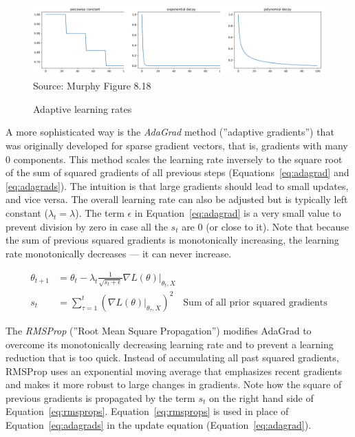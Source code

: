 \begin{figure}
\includegraphics[width=\textwidth]{screen5.png} \\

\scriptsize Source: Murphy Figure 8.18
\caption{Adaptive learning rates}
\label{fig:screen5_chap15}
\end{figure}

A more sophisticated way is the \emph{AdaGrad} method (''adaptive gradients'') that was originally developed for sparse gradient vectors, that is, gradients with many $0$ components. This method scales the learning rate inversely to the square root of the sum of squared gradients of all previous steps (Equations~\ref{eq:adagrad} and \ref{eq:adagrads}). The intuition is that large gradients should lead to small updates, and vice versa. The overall learning rate can also be adjusted but is typically left constant ($\lambda_t = \lambda$). The term $\epsilon$ in Equation~\ref{eq:adagrad} is a very small value to prevent division by zero in case all the $s_t$ are 0 (or close to it). Note that because the sum of previous squared gradients is monotonically increasing, the learning rate monotonically decreases --- it can never increase.

\begin{align}
\theta_{t+1} &= \theta_t - \lambda_t \frac{1}{\sqrt{s_t + \epsilon}}\nabla L(\theta) \rvert_{\theta_t, X} \label{eq:adagrad} \\
s_t &= \sum_{\tau=1}^t \left( \nabla L(\theta)\rvert_{\theta_\tau, X}\right)^2 \quad \text{Sum of all prior squared gradients} \label{eq:adagrads}
\end{align}

The \emph{RMSProp} (''Root Mean Square Propagation'') modifies AdaGrad to overcome its monotonically decreasing learning rate and to prevent a learning reduction that is too quick. Instead of accumulating all past squared gradients, RMSProp uses an exponential moving average that emphasizes recent gradients and makes it more robust to large changes in gradients. Note how the square of previous gradients is propagated by the term $s_t$ on the right hand side of Equation~\ref{eq:rmsprops}. Equation~\ref{eq:rmsprops} is used in place of Equation~\ref{eq:adagrads} in the update equation (Equation~\ref{eq:adagrad}).

